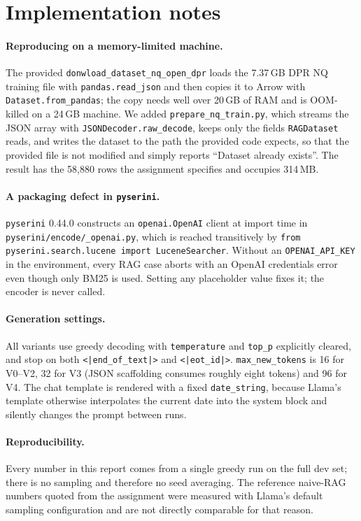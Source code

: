 \documentclass[11pt]{article}
\begin{document}


\appendix

\section{Implementation notes}
\label{sec:appendix}

\paragraph{Reproducing on a memory-limited machine.} The provided
\texttt{donwload\_dataset\_nq\_open\_dpr} loads the 7.37\,GB DPR NQ training file with
\texttt{pandas.read\_json} and then copies it to Arrow with \texttt{Dataset.from\_pandas};
the copy needs well over 20\,GB of RAM and is OOM-killed on a 24\,GB machine. We added
\texttt{prepare\_nq\_train.py}, which streams the JSON array with
\texttt{JSONDecoder.raw\_decode}, keeps only the fields \texttt{RAGDataset} reads, and writes
the dataset to the path the provided code expects, so that the provided file is not modified
and simply reports ``Dataset already exists''. The result has the 58,880 rows the assignment
specifies and occupies 314\,MB.

\paragraph{A packaging defect in \texttt{pyserini}.} \texttt{pyserini} 0.44.0 constructs an
\texttt{openai.OpenAI} client at import time in \texttt{pyserini/encode/\_openai.py}, which is
reached transitively by \texttt{from pyserini.search.lucene import LuceneSearcher}. Without an
\texttt{OPENAI\_API\_KEY} in the environment, every RAG case aborts with an OpenAI credentials
error even though only BM25 is used. Setting any placeholder value fixes it; the encoder is
never called.

\paragraph{Generation settings.} All variants use greedy decoding with
\texttt{temperature} and \texttt{top\_p} explicitly cleared, and stop on both
\texttt{<|end\_of\_text|>} and \texttt{<|eot\_id|>}. \texttt{max\_new\_tokens} is 16 for
\textsc{V0}--\textsc{V2}, 32 for \textsc{V3} (JSON scaffolding consumes roughly eight tokens)
and 96 for \textsc{V4}. The chat template is rendered with a fixed \texttt{date\_string},
because Llama's template otherwise interpolates the current date into the system block and
silently changes the prompt between runs.

\paragraph{Reproducibility.} Every number in this report comes from a single greedy run on the
full dev set; there is no sampling and therefore no seed averaging. The reference naive-RAG
numbers quoted from the assignment were measured with Llama's default sampling configuration
and are not directly comparable for that reason.
\end{document}
